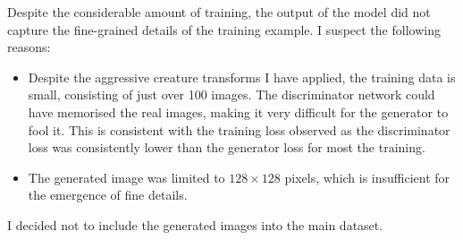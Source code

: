 \documentclass[12pt,a4paper,twoside,openany]{report}
\begin{document}
Despite the considerable amount of training, the output of the model did not capture the fine-grained details of the training example. I suspect the following reasons:
\begin{itemize}
    \item Despite the aggressive creature transforms I have applied, the training data is small, consisting of just over 100 images. The discriminator network could have memorised the real images, making it very difficult for the generator to fool it. This is consistent with the training loss observed as the discriminator loss was consistently lower than the generator loss for most the training.
    \item The generated image was limited to $128 \times 128$ pixels, which is insufficient for the emergence of fine details.
\end{itemize}

I decided not to include the generated images into the main dataset.
\end{document}
